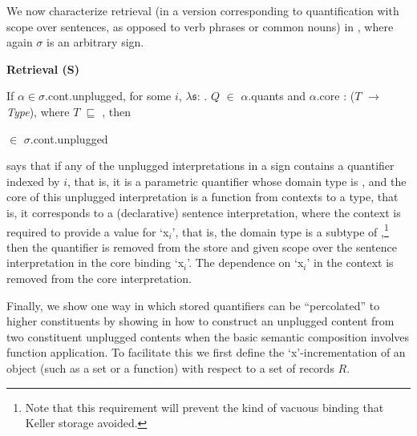 We now characterize retrieval (in a version corresponding to
quantification with scope over sentences, as opposed to verb phrases
or common nouns) in \nexteg{}, where again $\sigma$ is an arbitrary
sign.
\begin{ex} 
\textbf{Retrieval (S)} 

If $\alpha\in\sigma$.cont.unplugged, for some $i$,
$\lambda\mathfrak{s}$:
. $Q$ $\in$ $\alpha$.quants and $\alpha$.core : ($T$ $\rightarrow$
\textit{Type}), where $T$ $\sqsubseteq$
, then \\

\hspace*{1em}

\hspace*{4em}$\in$ $\sigma$.cont.unplugged
\end{ex} 
\preveg{} says that if any of the unplugged interpretations in a sign
contains a quantifier indexed by $i$, that is, it is a parametric
quantifier whose domain type is
, and the core of this
unplugged interpretation is a function from contexts to a type, that
is, it corresponds to a (declarative) sentence interpretation, where
the context is required to provide a value for `x$_i$', that is, the
domain type is a subtype of
,\footnote{Note that
  this requirement will prevent the kind of vacuous binding that
  Keller storage \citep{Keller1988} avoided.} then the quantifier is
removed from the store and given scope over the sentence
interpretation in the core binding `x$_i$'.  The dependence on `x$_i$'
in the context is removed from the core interpretation. 

Finally, we show one way in which stored quantifiers can be
``percolated'' to higher constituents by showing in \nexteg{} how to
construct an unplugged content from two constituent unplugged contents
when the basic semantic composition involves function application.  To
facilitate this we first define the `x'-incrementation of an object
(such as a set or a function) with respect to a set of records $R$.

